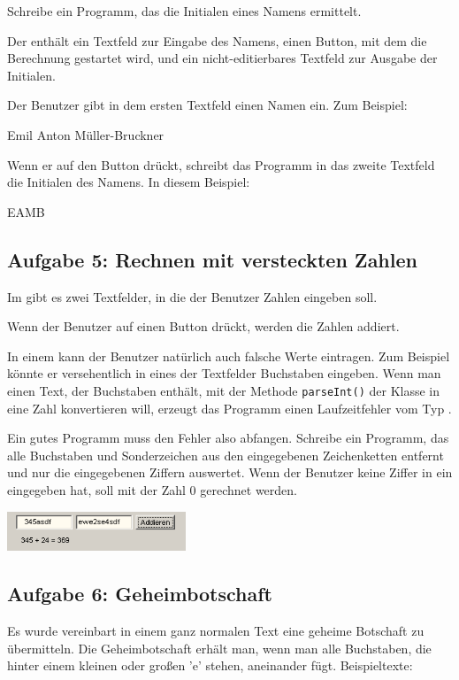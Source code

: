 Schreibe ein Programm, das die Initialen eines Namens ermittelt. 

Der  enthält ein Textfeld zur Eingabe des Namens, einen Button,
mit dem die Berechnung gestartet wird, und ein nicht-editierbares Textfeld zur
Ausgabe der Initialen.

Der Benutzer gibt in dem ersten Textfeld einen Namen ein. Zum Beispiel:

Emil Anton Müller-Bruckner

Wenn er auf den Button drückt, schreibt das Programm in das zweite Textfeld die
Initialen des Namens. In diesem Beispiel:

EAMB


\subsection{Aufgabe 5: Rechnen mit versteckten Zahlen}

Im  gibt es zwei Textfelder, in die der Benutzer Zahlen eingeben
soll.

Wenn der Benutzer auf einen Button drückt, werden die Zahlen addiert.

In einem  kann der Benutzer natürlich auch falsche Werte
eintragen. Zum Beispiel könnte er versehentlich in eines der Textfelder
Buchstaben eingeben. Wenn man einen Text, der Buchstaben enthält, mit der
Methode \lstinline|parseInt()| der Klasse  in eine Zahl
konvertieren will, erzeugt das Programm einen Laufzeitfehler vom Typ
.

Ein gutes Programm muss den Fehler also abfangen. Schreibe ein Programm, das
alle Buchstaben und Sonderzeichen aus den eingegebenen Zeichenketten entfernt
und nur die eingegebenen Ziffern auswertet. Wenn der Benutzer keine Ziffer in
ein  eingegeben hat, soll mit der Zahl 0 gerechnet werden.

\includegraphics[width=0.4\textwidth]{./inf/SEKII/24_Java_GUI-Komponenten/RechnenMitVerstecktenZahlen.png}


\subsection{Aufgabe 6: Geheimbotschaft}

Es wurde vereinbart in einem ganz normalen Text eine geheime Botschaft zu
übermitteln. Die Geheimbotschaft erhält man, wenn man alle Buchstaben, die
hinter einem kleinen oder großen ’e’ stehen, aneinander fügt. Beispieltexte:

